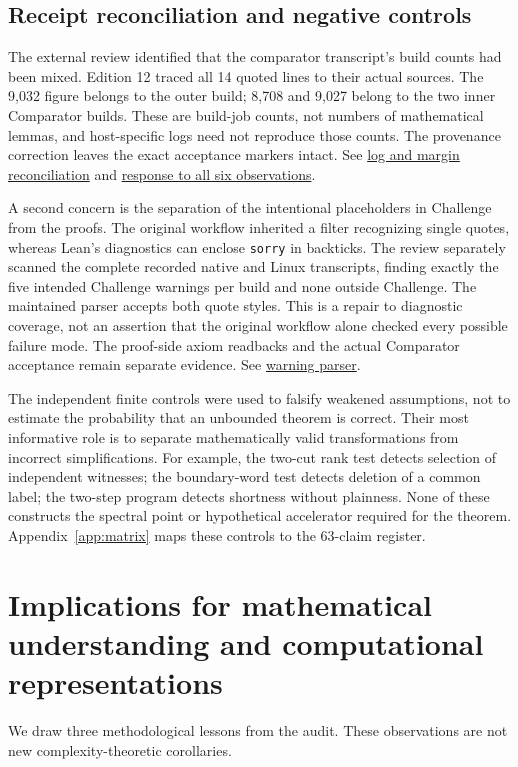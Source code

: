 \documentclass[11pt,letterpaper]{article}
\theoremstyle{definition}\newtheorem{definition}[theorem]{Definition}\newtheorem{example}[theorem]{Example}
\theoremstyle{remark}\newtheorem{remark}[theorem]{Remark}
\newcommand{\aud}[2]{\href{https://github.com/nousentllc/VP-VNP-Review/blob/567303d0bcf4f9d54390437b137752446e58ccd6/#1}{#2}}
\begin{document}
\subsection{Receipt reconciliation and negative controls}\label{sec:receipts}
The external review identified that the comparator transcript's build counts had been mixed. Edition 12 traced all 14 quoted lines to their actual sources. The 9,032 figure belongs to the outer build; 8,708 and 9,027 belong to the two inner Comparator builds. These are build-job counts, not numbers of mathematical lemmas, and host-specific logs need not reproduce those counts. The provenance correction leaves the exact acceptance markers intact. See \aud{reconciliation/edition12-comparator-and-margin.md}{log and margin reconciliation} and \aud{reconciliation/edition12-external-review.md}{response to all six observations}.

A second concern is the separation of the intentional placeholders in Challenge from the proofs. The original workflow inherited a filter recognizing single quotes, whereas Lean's diagnostics can enclose \texttt{sorry} in backticks. The review separately scanned the complete recorded native and Linux transcripts, finding exactly the five intended Challenge warnings per build and none outside Challenge. The maintained parser accepts both quote styles. This is a repair to diagnostic coverage, not an assertion that the original workflow alone checked every possible failure mode. The proof-side axiom readbacks and the actual Comparator acceptance remain separate evidence. See \aud{checks/pass14_warnings.py}{warning parser}.

The independent finite controls were used to falsify weakened assumptions, not to estimate the probability that an unbounded theorem is correct. Their most informative role is to separate mathematically valid transformations from incorrect simplifications. For example, the two-cut rank test detects selection of independent witnesses; the boundary-word test detects deletion of a common label; the two-step program detects shortness without plainness. None of these constructs the spectral point or hypothetical accelerator required for the theorem. Appendix~\ref{app:matrix} maps these controls to the 63-claim register.

\section{Implications for mathematical understanding and computational representations}\label{sec:implications}
We draw three methodological lessons from the audit. These observations are not new complexity-theoretic corollaries.
\end{document}
